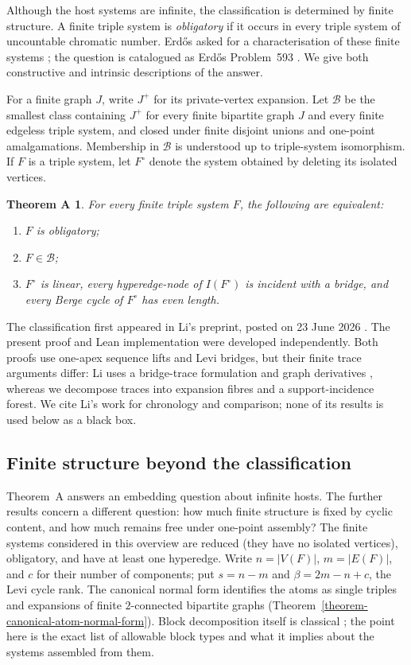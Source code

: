 \documentclass[a4paper,11pt,reqno]{amsart}
\theoremstyle{plain}
\newtheorem*{theoremA}{Theorem A}
\theoremstyle{definition}
\theoremstyle{remark}
\begin{document}
Although the host systems are infinite, the classification is determined by
finite structure.  A finite triple system is \emph{obligatory} if it occurs
in every triple system of uncountable chromatic number.  Erdős asked for a
characterisation of these finite systems \citep{erdos1995}; the question is
catalogued as Erdős Problem~593 \citep{bloom593}.  We give both constructive
and intrinsic descriptions of the answer.

For a finite graph $J$, write $J^+$ for its private-vertex expansion.  Let
$\mathcal B$ be the smallest class containing $J^+$ for every finite
bipartite graph $J$ and every finite edgeless triple system, and closed under
finite disjoint unions and one-point amalgamations.  Membership in
$\mathcal B$ is understood up to triple-system isomorphism.  If $F$ is a
triple system, let $F^\circ$ denote the system obtained by deleting its
isolated vertices.

\begin{theoremA}\label{theorem-a-exact-characterisation}
For every finite triple system $F$, the following are equivalent:
\begin{enumerate}
\item $F$ is obligatory;
\item $F\in\mathcal B$;
\item $F^\circ$ is linear, every hyperedge-node of $I(F^\circ)$ is incident
with a bridge, and every Berge cycle of $F^\circ$ has even length.
\end{enumerate}
\end{theoremA}

The classification first appeared in Li's preprint, posted on 23 June 2026
\citep[Theorem~1.1]{li2026}.  The present proof and Lean implementation were
developed independently.  Both proofs use one-apex sequence lifts and Levi
bridges, but their finite trace arguments differ: Li uses a bridge-trace
formulation and graph derivatives \citep[Sections~3--4 and Theorem~4.6]{li2026},
whereas we decompose traces into expansion fibres and a support-incidence
forest.  We cite Li's work for chronology and comparison; none of its results
is used below as a black box.
\subsection*{Finite structure beyond the classification}
Theorem~A answers an embedding question about infinite hosts.  The further
results concern a different question: how much finite structure is fixed by
cyclic content, and how much remains free under one-point assembly?  The finite
systems considered in this overview are reduced (they have no isolated
vertices), obligatory, and have at least one hyperedge.  Write \(n=|V(F)|\),
\(m=|E(F)|\), and \(c\) for their number of components; put \(s=n-m\) and
\(\beta=2m-n+c\), the Levi cycle rank.  The
canonical normal form identifies the atoms as single triples and expansions
of finite \(2\)-connected bipartite graphs
(Theorem~\ref{theorem-canonical-atom-normal-form}).  Block decomposition itself
is classical \citep{whitney1932,diestel2017}; the point here is the exact list
of allowable block types and what it implies about the systems assembled
from them.
\end{document}
